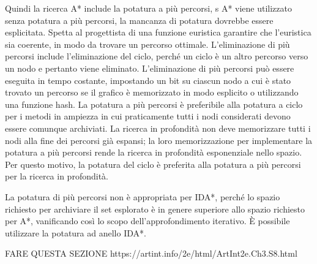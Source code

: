 \documentclass[a4paper]{extarticle}
\begin{document}
Quindi la ricerca A* include la potatura a più percorsi, s A* viene utilizzato senza potatura a più percorsi, la mancanza di potatura dovrebbe essere esplicitata. Spetta al progettista di una funzione euristica garantire che l'euristica sia coerente, in modo da trovare un percorso ottimale. L'eliminazione di più percorsi include l'eliminazione del ciclo, perché un ciclo è un altro percorso verso un nodo e pertanto viene eliminato. L'eliminazione di più percorsi può essere eseguita in tempo costante, impostando un bit su ciascun nodo a cui è stato trovato un percorso se il grafico è memorizzato in modo esplicito o utilizzando una funzione hash. La potatura a più percorsi è preferibile alla potatura a ciclo per i metodi in ampiezza in cui praticamente tutti i nodi considerati devono essere comunque archiviati. La ricerca in profondità non deve memorizzare tutti i nodi alla fine dei percorsi già espansi; la loro memorizzazione per implementare la potatura a più percorsi rende la ricerca in profondità esponenziale nello spazio. Per questo motivo, la potatura del ciclo è preferita alla potatura a più percorsi per la ricerca in profondità.

La potatura di più percorsi non è appropriata per IDA*, perché lo spazio richiesto per archiviare il set esplorato è in genere superiore allo spazio richiesto per A*, vanificando così lo scopo dell'approfondimento iterativo. È possibile utilizzare la potatura ad anello IDA*.

FARE QUESTA SEZIONE https://artint.info/2e/html/ArtInt2e.Ch3.S8.html
\end{document}
